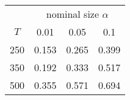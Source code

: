 % 

\renewcommand{\arraystretch}{1.2}
\begin{tabular}{cccc}
\hline
    & \multicolumn{3}{c}{nominal size $\alpha$} \\
$T$ & 0.01 & 0.05 & 0.1 \\ 
\hline
250 & 0.153 & 0.265 & 0.399 \\ 
350 & 0.192 & 0.333 & 0.517 \\ 
500 & 0.355 & 0.571 & 0.694 \\ 
\hline
\end{tabular}
